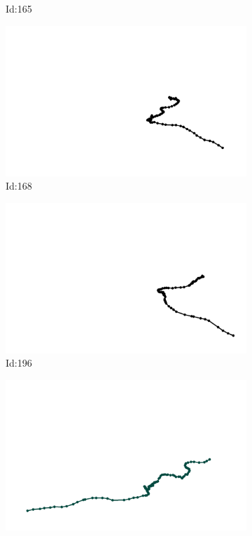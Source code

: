 \documentclass[12pt,twoside]{report}
\begin{document}
\begin{figure}
\begin{subfigure}[b]{0.20\textwidth}
\caption{Id:165}
\end{subfigure}
\begin{subfigure}[b]{0.20\textwidth}
\centering
\includegraphics[width=\textwidth]{../trajectories/168.png}
\caption{Id:168}
\end{subfigure}
\begin{subfigure}[b]{0.20\textwidth}
\centering
\includegraphics[width=\textwidth]{../trajectories/196.png}
\caption{Id:196}
\end{subfigure}
\begin{subfigure}[b]{0.20\textwidth}
\centering
\includegraphics[width=\textwidth]{../trajectories/199.png}

\end{subfigure}
\end{figure}
\end{document}
